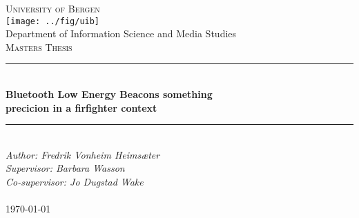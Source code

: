 \documentclass[../Main/thesis.tex]{subfiles}
\begin{document}

\newcommand{\HRule}{\rule{\linewidth}{0.5mm}}

\begin{titlepage}
\begin{center}
\textsc{\Huge University of Bergen}\\[0.4cm]
\texttt{[image: ../fig/uib]} \\[0.5cm]

\large Department of Information Science and Media Studies\\[0.7cm]
\textsc{\huge Masters Thesis}\\[0.4cm]
\HRule \\[0.4cm]
{ \huge \bfseries Bluetooth Low Energy Beacons something \\precicion in a firfighter context}\\[0.5cm]
\HRule \\[1.0cm]

\emph{Author: Fredrik Vonheim Heimsæter}\\
\emph{Supervisor: Barbara Wasson}\\
\emph{Co-supervisor: Jo Dugstad Wake}\\

\paragraph*{}
\end{center}
\vfill
\begin{center}
{\large \today}
\end{center}
\end{titlepage}
\end{document}

